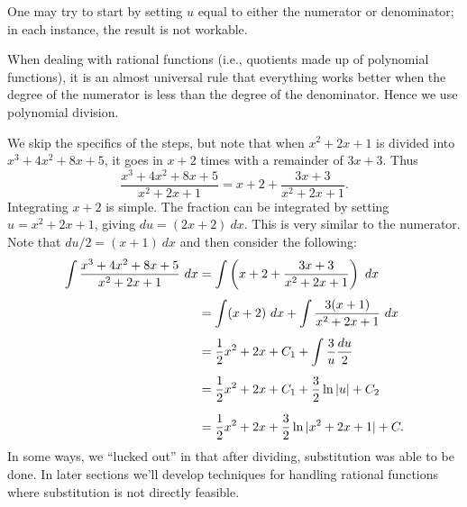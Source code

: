 {One may try to start by setting $u$ equal to either the numerator or denominator; in each instance, the result is not workable. 

When dealing with rational functions (i.e., quotients made up of polynomial functions), it is an almost universal rule that everything works better when the degree of the numerator is less than the degree of the denominator. Hence we use polynomial division.

We skip the specifics of the steps, but note that when $x^2+2x+1$ is divided into $x^3+4x^2+8x+5$, it goes in $x+2$ times with a remainder of $3x+3$. Thus 
	$$\frac{x^3+4x^2+8x+5}{x^2+2x+1} = x+2 + \frac{3x+3}{x^2+2x+1}.$$
Integrating $x+2$ is simple. The fraction can be integrated by setting $u = x^2+2x+1$, giving $du = (2x+2)\ dx$. This is very similar to the numerator. Note that $du/2 = (x+1)\ dx$ and then consider the following:
\begin{align*}
\int \frac{x^3+4x^2+8x+5}{x^2+2x+1}\ dx & = \int \left(x+2 + \frac{3x+3}{x^2+2x+1}\right)\ dx  \rule[-13pt]{0pt}{5pt} \\
					&= \int (x+2)\ dx + \int \frac{3(x+1)}{x^2+2x+1}\ dx  \rule[-13pt]{0pt}{5pt}\\
					& = \frac12x^2+2x+C_1 + \int \frac{3}{u}\frac{du}{2}  \rule[-13pt]{0pt}{5pt}\\
					&= \frac12x^2+2x+C_1 + \frac32\ln|u| + C_2 \rule[-13pt]{0pt}{5pt}\\
					&= \frac12x^2+2x+\frac32\ln|x^2+2x+1| + C.
\end{align*}
In some ways, we ``lucked out'' in that after dividing, substitution was able to be done. In later sections we'll develop techniques for handling rational functions where substitution is not directly feasible.
}\\


